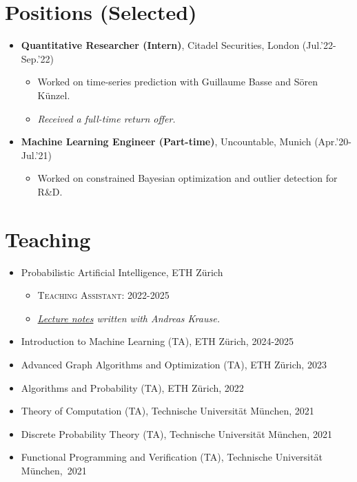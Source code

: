 \documentclass[a4paper,12pt]{article}
\begin{document}
\section*{Positions (Selected)}
\begin{itemize}[leftmargin=1.5em]
  \item \textbf{Quantitative Researcher (Intern)}, Citadel Securities, London (Jul.'22-Sep.'22) \begin{itemize}
    \item Worked on time-series prediction with Guillaume Basse and Sören Künzel.
    \item \emph{Received a full-time return offer.}
  \end{itemize}
  \item \textbf{Machine Learning Engineer (Part-time)}, Uncountable, Munich (Apr.'20-Jul.'21) \begin{itemize}
    \item Worked on constrained Bayesian optimization and outlier detection for R\&D.
  \end{itemize}
\end{itemize}

\section*{Teaching}
\begin{itemize}[leftmargin=1.5em]
  \item {Probabilistic Artificial Intelligence}, ETH Zürich \begin{itemize}
    \item \textsc{Teaching Assistant:} 2022-2025
    \item \emph{\href{https://arxiv.org/pdf/2502.05244}{Lecture notes} written with Andreas Krause.}
  \end{itemize}
  \item {Introduction to Machine Learning (TA)}, ETH Zürich, 2024-2025
  \item {Advanced Graph Algorithms and Optimization (TA)}, ETH Zürich, 2023
  \item {Algorithms and Probability (TA)}, ETH Zürich, 2022
  \item {Theory of Computation (TA)}, Technische Universität München, 2021
  \item {Discrete Probability Theory (TA)}, Technische Universität München, 2021
  \item {Functional Programming and Verification (TA)}, Technische Universität München,~2021
\end{itemize}
\end{document}
